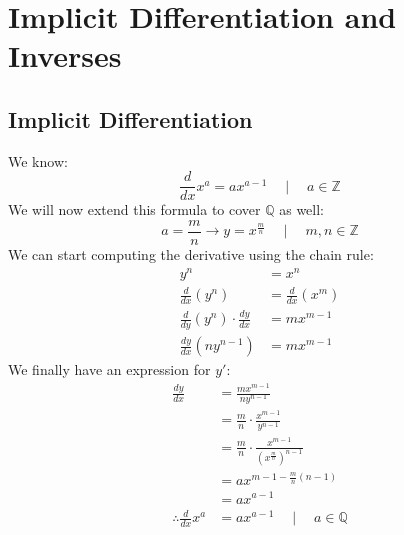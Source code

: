 \documentclass[../main.tex]{subfiles}
\begin{document}
%
\chapter{Implicit Differentiation and Inverses}
\section{Implicit Differentiation}
%
We know:
\[ \frac{d}{dx} x^a = ax^{a-1} \quad \mid \quad a \in \mathbb{Z} \]
We will now extend this formula to cover $\mathbb{Q}$ as well:
\[
    a = \frac{m}{n} \rightarrow y = x^{\frac{m}{n}}
    \quad \mid \quad
    m, n \in \mathbb{Z}
\]
We can start computing the derivative using the chain rule:%
%
\begin{align*}
    y^n                                                 & = x^n                             \\
    \frac{d}{dx} \left( y^n \right)                     & = \frac{d}{dx} \left( x^m \right) \\
    \frac{d}{dy} \left( y^n \right) \cdot \frac{dy}{dx} & = mx^{m - 1}                      \\
    \frac{dy}{dx} \left( ny^{n - 1} \right)             & = mx^{m - 1}
\end{align*}
%
We finally have an expression for $y'$:
%
\begin{align*}
    \frac{dy}{dx}               & = \frac{mx^{m - 1}}{ny^{n - 1}}                                              \\
                                & = \frac{m}{n} \cdot \frac{x^{m - 1}}{y^{n - 1}}                              \\
                                & = \frac{m}{n} \cdot \frac{x^{m - 1}}{\left( x^{\frac{m}{n}} \right)^{n - 1}} \\
                                & = ax^{m - 1 - \frac{m}{n}(n - 1)}                                            \\
                                & = ax^{a - 1}                                                                 \\
    \therefore \frac{d}{dx} x^a & = ax^{a - 1} \quad \mid \quad a \in \mathbb{Q}
\end{align*}
%
\end{document}
